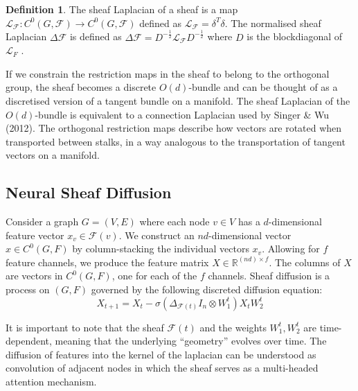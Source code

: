 \documentclass{article}
\theoremstyle{definition}
\newtheorem{definition}{Definition}[section]
\begin{document}
\begin{definition}
    The sheaf Laplacian of a sheaf is a map $\mathcal{L}_\mathcal{F} : C^0(G, \mathcal{F}) \to C^0(G, \mathcal{F})$ defined as $\mathcal{L}_\mathcal{F} = \delta^T \delta$. The normalised sheaf Laplacian $\Delta \mathcal{F}$  is defined as $ \Delta \mathcal{F} = D^{-\frac{1}{2}} \mathcal{L}_\mathcal{F} D^{-\frac{1}{2}}$ where $D$ is the blockdiagonal of $\mathcal{L}_{F}$ .
\end{definition}  

If we constrain the restriction maps in the sheaf to belong to the orthogonal group, the sheaf becomes a discrete $O(d)$-bundle and can be thought of as a discretised version of a tangent bundle on a manifold. The sheaf Laplacian of the $O(d)$-bundle is equivalent to a connection Laplacian used by Singer \& Wu (2012). The orthogonal restriction maps describe how vectors are rotated when transported between stalks, in a way analogous to the transportation of tangent vectors on a manifold.

\subsection{Neural Sheaf Diffusion}
\label{sec:sheaf-diffusion}

Consider a graph $G = (V, E)$ where each node $v \in V$ has a $d$-dimensional feature vector $x_v \in \mathcal{F}(v)$. We construct an $nd$-dimensional vector $x \in C^0 (G, F)$ by column-stacking the individual vectors $x_v$. Allowing for $f$ feature channels, we produce the feature matrix $X \in \mathbb{R}^{(nd) \times f}$. The columns of $X$ are vectors
in $C^0 (G, F)$, one for each of the $f$ channels. Sheaf diffusion is a process on $(G, F)$ governed by the following discreted diffusion equation: 
\begin{equation}
X_{t+1} = X_t - \sigma(\Delta_{\mathcal{F}(t)} I_n \otimes W^t_1 ) X_t W^t_2
\end{equation}

It is important to note that the sheaf $\mathcal{F}(t)$ and the weights $W^t_1, W^t_2$ are time-dependent, meaning that the underlying ``geometry'' evolves over time. 
The diffusion of features into the kernel of the laplacian can be understood as convolution of adjacent nodes in which the sheaf serves as a multi-headed attention mechanism.

\end{document}
